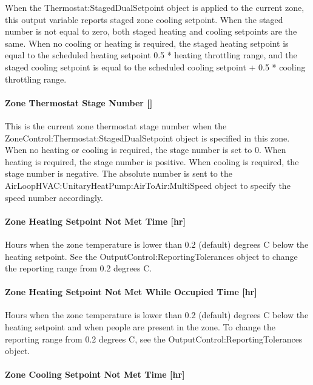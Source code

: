 When the Thermostat:StagedDualSetpoint object is applied to the current zone, this output variable reports staged zone cooling setpoint. When the staged number is not equal to zero, both staged heating and cooling setpoints are the same. When no cooling or heating is required, the staged heating setpoint is equal to the scheduled heating setpoint 0.5 * heating throttling range, and the staged cooling setpoint is equal to the scheduled cooling setpoint + 0.5 * cooling throttling range.

\paragraph{Zone Thermostat Stage Number {[]}}\label{zone-thermostat-stage-number}

This is the current zone thermostat stage number when the ZoneControl:Thermostat:StagedDualSetpoint object is specified in this zone. When no heating or cooling is required, the stage number is set to 0. When heating is required, the stage number is positive. When cooling is required, the stage number is negative. The absolute number is sent to the AirLoopHVAC:UnitaryHeatPump:AirToAir:MultiSpeed object to specify the speed number accordingly.

\paragraph{Zone Heating Setpoint Not Met Time {[}hr{]}}\label{zone-heating-setpoint-not-met-time-hr}

Hours when the zone temperature is lower than 0.2 (default) degrees C below the heating setpoint. See the OutputControl:ReportingTolerances object to change the reporting range from 0.2 degrees C.

\paragraph{Zone Heating Setpoint Not Met While Occupied Time {[}hr{]}}\label{zone-heating-setpoint-not-met-while-occupied-time-hr}

Hours when the zone temperature is lower than 0.2 (default) degrees C below the heating setpoint and when people are present in the zone. To change the reporting range from 0.2 degrees C, see the OutputControl:ReportingTolerances object.

\paragraph{Zone Cooling Setpoint Not Met Time {[}hr{]}}\label{zone-cooling-setpoint-not-met-time-hr}

